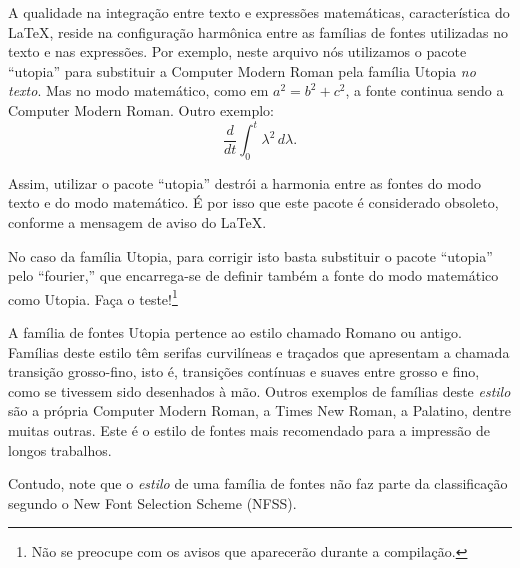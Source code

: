 \documentclass{article}
\begin{document}
	A qualidade na integração entre texto e expressões matemáticas, característica do \LaTeX, reside na configuração harmônica entre as famílias de fontes utilizadas no texto e nas expressões. Por exemplo, neste arquivo nós utilizamos o pacote ``utopia'' para substituir a Computer Modern Roman pela família Utopia \emph{no texto}. Mas no modo matemático, como em $a^2 = b^2 + c^2$, a fonte continua sendo a Computer Modern Roman. Outro exemplo:		
	\[ %
	\frac{d}{dt}\int_0^t \lambda^2\, d\lambda.
	\] %

	Assim, utilizar o pacote ``utopia'' destrói a harmonia entre as fontes do modo texto e do modo matemático. É por isso que este pacote é considerado obsoleto, conforme a mensagem de aviso do \LaTeX.
	
	No caso da família Utopia, para corrigir isto basta substituir o pacote ``utopia'' pelo ``fourier,'' que encarrega-se de definir também a fonte do modo matemático como Utopia. Faça o teste!\footnote{Não se preocupe com os avisos que aparecerão durante a compilação.}
	
	A família de fontes Utopia pertence ao estilo chamado Romano ou antigo. Famílias deste estilo têm serifas curvilíneas e traçados que apresentam a chamada transição grosso-fino, isto é, transições contínuas e suaves entre grosso e fino, como se tivessem sido desenhados à mão. Outros exemplos de famílias deste \emph{estilo} são a própria Computer Modern Roman, a Times New Roman, a Palatino, dentre muitas outras. Este é o estilo de fontes mais recomendado para a impressão de longos trabalhos.
	
	Contudo, note que o \emph{estilo} de uma família de fontes não faz parte da classificação segundo o New Font Selection Scheme (NFSS).
\end{document}
